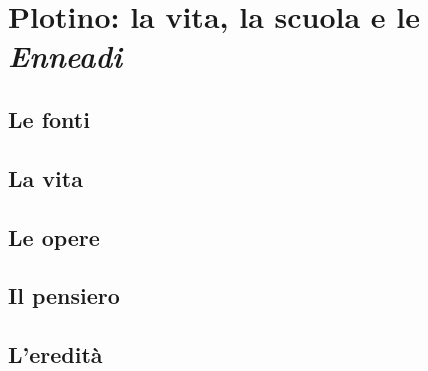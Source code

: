 \chapter{Plotino: la vita, la scuola e le \emph{Enneadi}}

\section{Le fonti}

\section{La vita}

\section{Le opere}

\section{Il pensiero}

\section{L'eredità}
